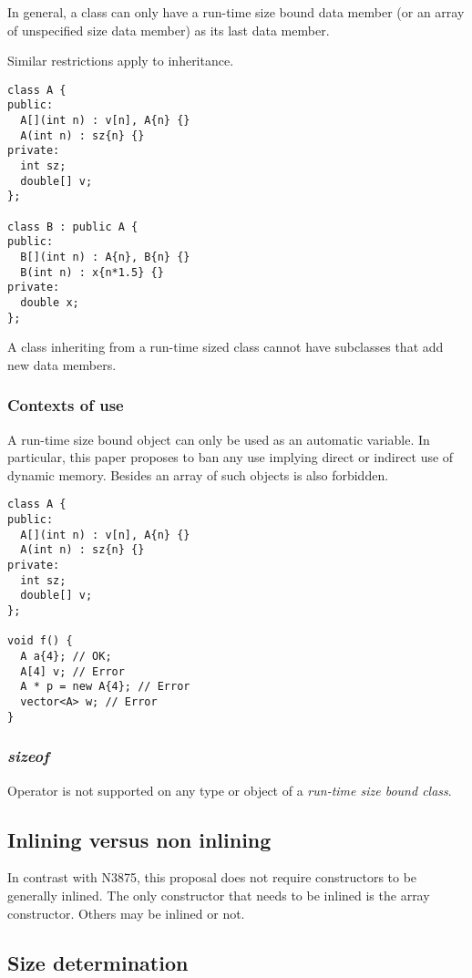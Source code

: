 In general, a class can only have a run-time size bound data member (or 
an array of unspecified size data member) as its last data member. 

Similar restrictions apply to inheritance.

\begin{lstlisting}
class A {
public:
  A[](int n) : v[n], A{n} {}
  A(int n) : sz{n} {}
private:
  int sz;
  double[] v;
};

class B : public A {
public:
  B[](int n) : A{n}, B{n} {}
  B(int n) : x{n*1.5} {}
private:
  double x;
};
\end{lstlisting}

A class inheriting from a run-time sized class cannot have subclasses that add new data members.

\subsubsection{Contexts of use}

A run-time size bound object can only be used as an automatic variable.
In particular, this paper proposes to ban any use implying direct or indirect
use of dynamic memory. Besides an array of such objects is also forbidden.

\begin{lstlisting}
class A {
public:
  A[](int n) : v[n], A{n} {}
  A(int n) : sz{n} {}
private:
  int sz;
  double[] v;
};

void f() {
  A a{4}; // OK;
  A[4] v; // Error
  A * p = new A{4}; // Error
  vector<A> w; // Error
}
\end{lstlisting}

\subsubsection{\emph{sizeof}}

Operator  is not supported on any type or object of a \emph{run-time size bound class}.

\subsection{Inlining versus non inlining}

In contrast with N3875, this proposal does not require constructors to be
generally inlined. The only constructor that needs to be inlined is the
array constructor. Others may be inlined or not.

\subsection{Size determination}
\label{sec:inline-size-det}

